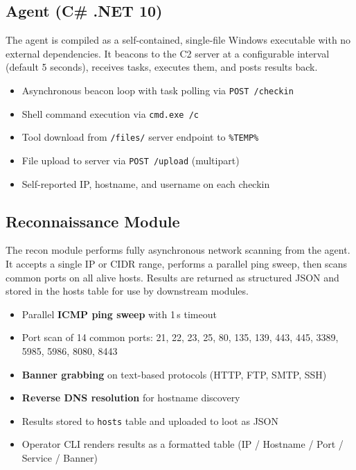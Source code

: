 \documentclass[11pt,a4paper]{article}
\begin{document}
\subsection{Agent (C\# .NET 10)}

The agent is compiled as a self-contained, single-file Windows executable with no external dependencies. It beacons to the C2 server at a configurable interval (default 5 seconds), receives tasks, executes them, and posts results back.

\begin{itemize}[leftmargin=16pt, itemsep=2pt]
    \item Asynchronous beacon loop with task polling via \texttt{POST /checkin}
    \item Shell command execution via \texttt{cmd.exe /c}
    \item Tool download from \texttt{/files/} server endpoint to \texttt{\%TEMP\%}
    \item File upload to server via \texttt{POST /upload} (multipart)
    \item Self-reported IP, hostname, and username on each checkin
\end{itemize}

\subsection{Reconnaissance Module}

The recon module performs fully asynchronous network scanning from the agent. It accepts a single IP or CIDR range, performs a parallel ping sweep, then scans common ports on all alive hosts. Results are returned as structured JSON and stored in the hosts table for use by downstream modules.

\begin{itemize}[leftmargin=16pt, itemsep=2pt]
    \item Parallel \textbf{ICMP ping sweep} with 1\,s timeout
    \item Port scan of 14 common ports: 21, 22, 23, 25, 80, 135, 139, 443, 445, 3389, 5985, 5986, 8080, 8443
    \item \textbf{Banner grabbing} on text-based protocols (HTTP, FTP, SMTP, SSH)
    \item \textbf{Reverse DNS resolution} for hostname discovery
    \item Results stored to \texttt{hosts} table and uploaded to loot as JSON
    \item Operator CLI renders results as a formatted table (IP / Hostname / Port / Service / Banner)
\end{itemize}
\end{document}
